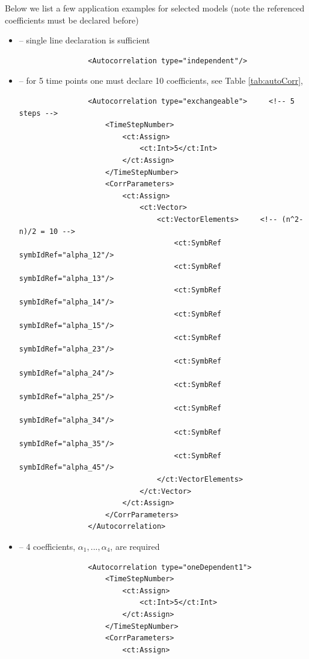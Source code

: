 Below we list a few application examples for selected models (note the referenced
coefficients must be declared before)
\begin{itemize}
\item 
{} -- single line declaration is sufficient
\lstset{language=XML}
\begin{lstlisting}
                <Autocorrelation type="independent"/>
\end{lstlisting}
\item 
{} -- for 5 time points one must declare 10 coefficients, see Table \ref{tab:autoCorr},
\begin{lstlisting}
                <Autocorrelation type="exchangeable">     <!-- 5 steps -->
                    <TimeStepNumber>
                        <ct:Assign>
                            <ct:Int>5</ct:Int>
                        </ct:Assign>
                    </TimeStepNumber>
                    <CorrParameters>
                        <ct:Assign>
                            <ct:Vector>
                                <ct:VectorElements>     <!-- (n^2-n)/2 = 10 -->
                                    <ct:SymbRef symbIdRef="alpha_12"/>
                                    <ct:SymbRef symbIdRef="alpha_13"/>
                                    <ct:SymbRef symbIdRef="alpha_14"/>
                                    <ct:SymbRef symbIdRef="alpha_15"/>
                                    <ct:SymbRef symbIdRef="alpha_23"/>
                                    <ct:SymbRef symbIdRef="alpha_24"/>
                                    <ct:SymbRef symbIdRef="alpha_25"/>
                                    <ct:SymbRef symbIdRef="alpha_34"/>
                                    <ct:SymbRef symbIdRef="alpha_35"/>
                                    <ct:SymbRef symbIdRef="alpha_45"/>
                                </ct:VectorElements>
                            </ct:Vector>
                        </ct:Assign>
                    </CorrParameters>
                </Autocorrelation>
\end{lstlisting}
\item 
{} -- 4 coefficients, $\alpha_1, ..., \alpha_4$, are required
\begin{lstlisting}
                <Autocorrelation type="oneDependent1">
                    <TimeStepNumber>
                        <ct:Assign>
                            <ct:Int>5</ct:Int>
                        </ct:Assign>
                    </TimeStepNumber>
                    <CorrParameters>
                        <ct:Assign>

\end{lstlisting}
\end{itemize}
